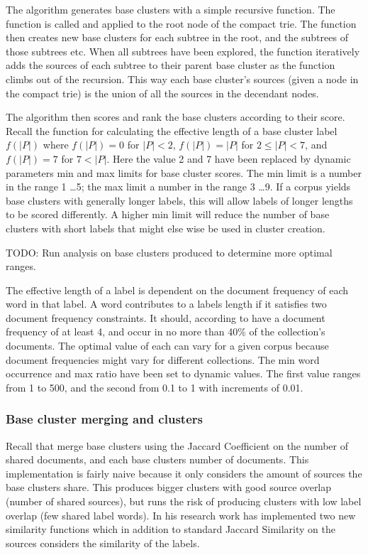 The \CTC algorithm generates base clusters with a simple recursive function. The function is called and applied to the root node of the compact trie. The function then creates new base clusters for each subtree in the root, and the subtrees of those subtrees etc. When all subtrees have been explored, the function iteratively adds the sources of each subtree to their parent base cluster as the function climbs out of the recursion. This way each base cluster's sources (given a node in the compact trie) is the union of all the sources in the decendant nodes.

The algorithm then scores and rank the base clusters according to their score. Recall the function for calculating the effective length of a base cluster label \(f(\vert P \vert)\) where \(f(\vert P \vert) = 0\) for \(\vert P \vert < 2\), \(f(\vert P \vert) = \vert P \vert\) for \(2 \le \vert P \vert < 7\), and \(f(\vert P \vert) = 7\) for \(7 < \vert P \vert\). Here the value 2 and 7 have been replaced by dynamic parameters min and max limits for base cluster scores. The min limit is a number in the range 1 \dots 5; the max limit a number in the range 3 \dots 9. If a corpus yields base clusters with generally longer labels, this will allow labels of longer lengths to be scored differently. A higher min limit will reduce the number of base clusters with short labels that might else wise be used in cluster creation.

TODO: Run analysis on base clusters produced to determine more optimal ranges.

The effective length of a label is dependent on the document frequency of each word in that label. A word contributes to a labels length if it satisfies two document frequency constraints. It should, according to \cite{Oren1998} have a document frequency of at least 4, and occur in no more than 40\% of the collection's documents. The optimal value of each can vary for a given corpus because document frequencies might vary for different collections. The min word occurrence and max ratio have been set to dynamic values. The first value ranges from 1 to 500, and the second from 0.1 to 1 with increments of 0.01.

\subsubsection{Base cluster merging and clusters}
Recall that \cite{Oren1998} merge base clusters using the Jaccard Coefficient on the number of shared documents, and each base clusters number of documents. This implementation is fairly naive because it only considers the amount of sources the base clusters share. This produces bigger clusters with good source overlap (number of shared sources), but runs the risk of producing clusters with low label overlap (few shared label words). In his research work \supervisor has implemented two new similarity functions which in addition to standard Jaccard Similarity on the sources considers the similarity of the labels. 

